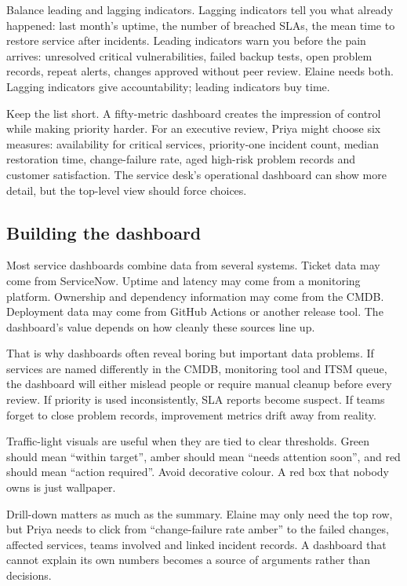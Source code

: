 Balance leading and lagging indicators. Lagging indicators tell you what already happened: last month's uptime, the number of breached SLAs, the mean time to restore service after incidents. Leading indicators warn you before the pain arrives: unresolved critical vulnerabilities, failed backup tests, open problem records, repeat alerts, changes approved without peer review. Elaine needs both. Lagging indicators give accountability; leading indicators buy time.


Keep the list short. A fifty-metric dashboard creates the impression of control while making priority harder. For an executive review, Priya might choose six measures: availability for critical services, priority-one incident count, median restoration time, change-failure rate, aged high-risk problem records and customer satisfaction. The service desk's operational dashboard can show more detail, but the top-level view should force choices.



\subsection{Building the dashboard}


Most service dashboards combine data from several systems. Ticket data may come from ServiceNow. Uptime and latency may come from a monitoring platform. Ownership and dependency information may come from the CMDB. Deployment data may come from GitHub Actions or another release tool. The dashboard's value depends on how cleanly these sources line up.


That is why dashboards often reveal boring but important data problems. If services are named differently in the CMDB, monitoring tool and ITSM queue, the dashboard will either mislead people or require manual cleanup before every review. If priority is used inconsistently, SLA reports become suspect. If teams forget to close problem records, improvement metrics drift away from reality.


Traffic-light visuals are useful when they are tied to clear thresholds. Green should mean ``within target'', amber should mean ``needs attention soon'', and red should mean ``action required''. Avoid decorative colour. A red box that nobody owns is just wallpaper.


Drill-down matters as much as the summary. Elaine may only need the top row, but Priya needs to click from ``change-failure rate amber'' to the failed changes, affected services, teams involved and linked incident records. A dashboard that cannot explain its own numbers becomes a source of arguments rather than decisions.



